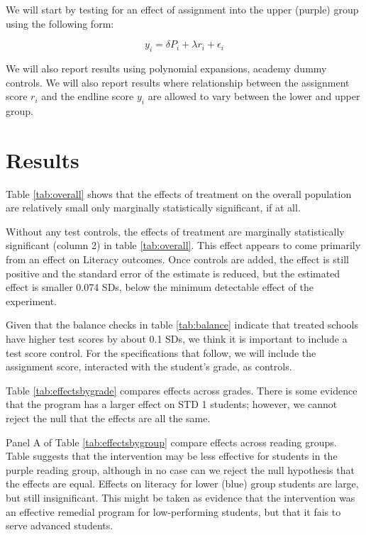 \documentclass[10pt]{article}
\begin{document}
We will start by testing for an effect of assignment into the upper (purple) group using the following form:

\[ y_{i} = \delta P_i + \lambda r_i + \epsilon_{i} \]

We will also report results using polynomial expansions, academy dummy controls. We will also report results where relationship between the assignment score $r_i$ and the endline score $y_i$ are allowed to vary between the lower and upper group.


\section{Results}

Table \ref{tab:overall} shows that the effects of treatment on the overall population are relatively small only marginally statistically significant, if at all. 




Without any test controls, the effects of treatment are marginally statistically significant (column 2) in table \ref{tab:overall}. This effect appears to come primarily from an effect on Literacy outcomes. Once controls are added, the effect is still positive and the standard error of the estimate is reduced, but the estimated effect is smaller 0.074 SDs, below the minimum detectable effect of the experiment. 

Given that the balance checks in table \ref{tab:balance} indicate that treated schools have higher test scores by about 0.1 SDs, we think it is important to include a test score control. For the specifications that follow, we will include the assignment score, interacted with the student's grade, as controls.



Table \ref{tab:effectsbygrade} compares effects across grades. There is some evidence that the program has a larger effect on STD 1 students; however, we cannot reject the null that the effects are all the same.



Panel A of Table \ref{tab:effectsbygroup} compare effects across reading groups. Table suggests that the intervention may be less effective for students in the purple reading group, although in no case can we reject the null hypothesis that the effects are equal. Effects on literacy for lower (blue) group students are large, but still insignificant. This might be taken as evidence that the intervention was an effective remedial program for low-performing students, but that it fais to serve advanced students.
\end{document}
